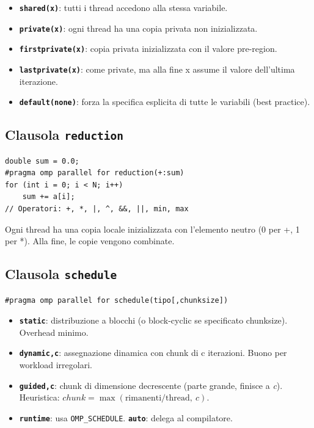 \documentclass[11pt,a4paper]{article}
\theoremstyle{remark}
\begin{document}
\begin{itemize}
  \item \textbf{\lstinline|shared(x)|}: tutti i thread accedono alla stessa variabile.
  \item \textbf{\lstinline|private(x)|}: ogni thread ha una copia privata non inizializzata.
  \item \textbf{\lstinline|firstprivate(x)|}: copia privata inizializzata con il valore pre-region.
  \item \textbf{\lstinline|lastprivate(x)|}: come private, ma alla fine x assume il valore dell'ultima iterazione.
  \item \textbf{\lstinline|default(none)|}: forza la specifica esplicita di tutte le variabili (best practice).
\end{itemize}

\subsection{Clausola \texttt{reduction}}

\begin{lstlisting}[style=cpp]
double sum = 0.0;
#pragma omp parallel for reduction(+:sum)
for (int i = 0; i < N; i++)
    sum += a[i];
// Operatori: +, *, |, ^, &&, ||, min, max
\end{lstlisting}

Ogni thread ha una copia locale inizializzata con l'elemento neutro (0 per +, 1 per *). Alla fine, le copie vengono combinate.

\subsection{Clausola \texttt{schedule}}

\begin{lstlisting}[style=bash]
#pragma omp parallel for schedule(tipo[,chunksize])
\end{lstlisting}

\begin{itemize}
  \item \textbf{\lstinline|static|}: distribuzione a blocchi (o block-cyclic se specificato chunksize). Overhead minimo.
  \item \textbf{\lstinline|dynamic,c|}: assegnazione dinamica con chunk di c iterazioni. Buono per workload irregolari.
  \item \textbf{\lstinline|guided,c|}: chunk di dimensione decrescente (parte grande, finisce a \textit{c}). Heuristica: $chunk = \max(\text{rimanenti}/\text{thread},\ c)$.
  \item \textbf{\lstinline|runtime|}: usa \texttt{OMP\_SCHEDULE}. \textbf{\lstinline|auto|}: delega al compilatore.
\end{itemize}
\end{document}
